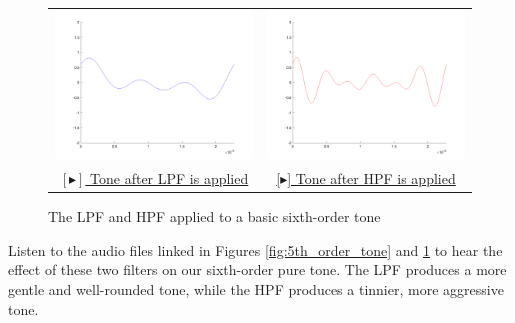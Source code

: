 \begin{figure}[h]
\begin{tabular}{cc}
        \includegraphics[scale=.15]{6th_order_tone_LPF.png} & \includegraphics[scale=.15]{6th_order_tone_HPF.png}\\
        \href{https://drive.google.com/file/d/1tjxLPXLkrhaWuaD99JjpF7ysoxVjJbhO/view?usp=sharing}{\color{blue} $[\blacktriangleright]$ Tone after LPF is applied} & \href{https://drive.google.com/file/d/1M0l6kBrHJ0WfIffrrLXCgEpl2vRaUZTi/view?usp=sharing}{\color{blue} [$\blacktriangleright$] Tone after HPF is applied}\\
    \end{tabular}
    \caption{The LPF and HPF applied to a basic sixth-order tone}
    \label{fig:5th_order_tone_filtered}
\end{figure}

\par \bigskip Listen to the audio files linked in Figures \ref{fig:5th_order_tone} and \ref{fig:5th_order_tone_filtered} to hear the effect of these two filters on our sixth-order pure tone. The LPF produces a more gentle and well-rounded tone, while the HPF produces a tinnier, more aggressive tone.

\par \bigskip 